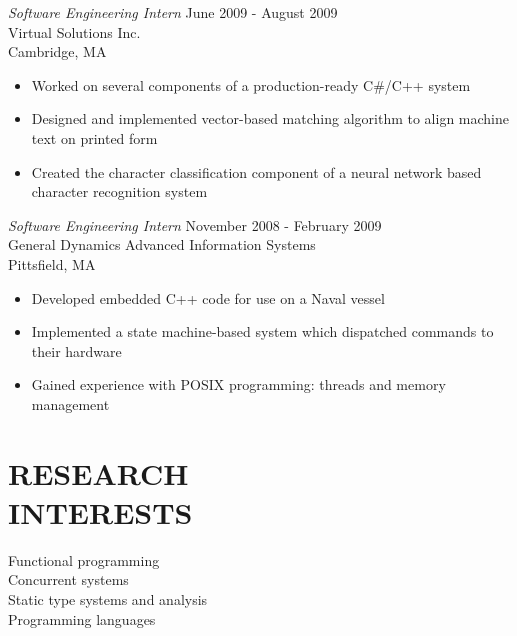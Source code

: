 \documentclass[margin]{res}
\begin{document}
\begin{resume}
                {\sl Software Engineering Intern} \hfill            June 2009 - August 2009 \\
                Virtual Solutions Inc. \\ 
                Cambridge, MA
                 \begin{itemize}  \itemsep -2pt %
                  \item Worked on several components of a production-ready C\#/C++ system
                  \item Designed and implemented vector-based matching algorithm to align machine text on printed form
                  \item Created the character classification component of a 
                    neural network based character recognition system
                 \end{itemize} 
                {\sl Software Engineering Intern} \hfill        November 2008 - February 2009 \\
                General Dynamics Advanced Information Systems \\
                Pittsfield, MA
                  \begin{itemize}  \itemsep -2pt
                   \item Developed embedded C++ code for use on a Naval vessel
                   \item Implemented a state machine-based system which dispatched commands to their hardware
                   \item Gained experience with POSIX programming: threads and memory management
                  \end{itemize} 

\section{RESEARCH \\ INTERESTS}             
                 Functional programming \\
                 Concurrent systems \\
                 Static type systems and analysis \\
                 Programming languages
\end{resume}
\end{document}
